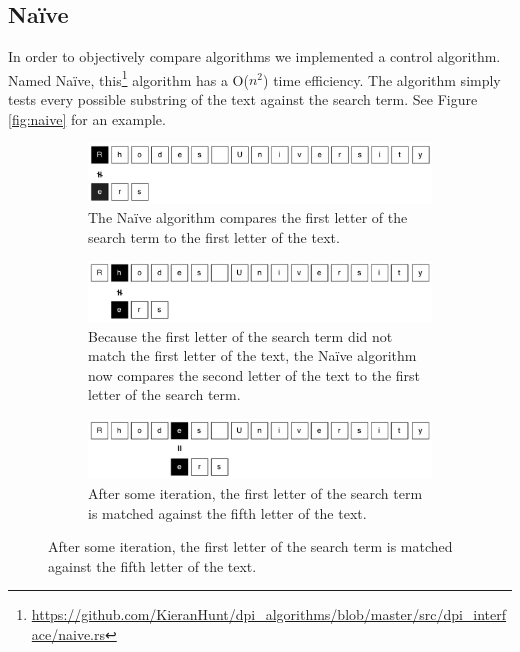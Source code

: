 \documentclass{article}
\begin{document}
\subsection{Na{\"i}ve} \label{sec:naive}
In order to objectively compare algorithms we implemented a control algorithm. Named Na{\"i}ve, this\footnote{\url{https://github.com/KieranHunt/dpi_algorithms/blob/master/src/dpi_interface/naive.rs}} algorithm has a O(\(n^2\)) time efficiency. The algorithm simply tests every possible substring of the text against the search term. See Figure \ref{fig:naive} for an example.
\begin{figure}[h!bt]
  
  \centering
  
  \begin{subfigure}{\textwidth}
  \makeatletter
  \includegraphics[width=\textwidth]{images/naive-1}
  \caption{The Na{\"i}ve algorithm compares the first letter of the search term to the first letter of the text.}
  \end{subfigure}
  
  \begin{subfigure}{\textwidth}
  \makeatletter
  \includegraphics[width=\textwidth]{images/naive-2}
  \caption{Because the first letter of the search term did not match the first letter of the text, the Na{\"i}ve algorithm now compares the second letter of the text to the first letter of the search term.}
  \end{subfigure}
  
  \begin{subfigure}{\textwidth}
  \makeatletter
  \includegraphics[width=\textwidth]{images/naive-3}
  \caption{After some iteration, the first letter of the search term is matched against the fifth letter of the text.}
  \end{subfigure}
  

\end{figure}
\end{document}
